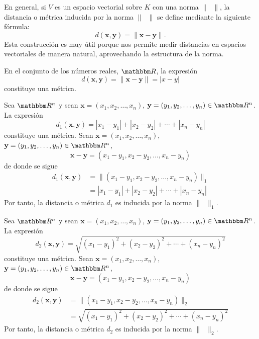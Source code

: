 En general, si $V$ es un espacio vectorial sobre $K$ con una norma $\| \phantom{x} \|$, la distancia o métrica inducida por la norma $\| \phantom{x} \|$ se define mediante la siguiente fórmula:
$$d(\mathbf{x}, \mathbf{y}) = \| \mathbf{x} - \mathbf{y} \|.$$
Esta construcción es muy útil porque nos permite medir distancias en espacios vectoriales de manera natural, aprovechando la estructura de la norma.

\begin{examplebox}{}{}
    En el conjunto de los números reales, $\RR$, la expresión
    $$d(\mathbf{x}, \mathbf{y}) = \| \mathbf{x} - \mathbf{y} \| = |x - y|$$
    constituye una métrica.
\end{examplebox}

\newpage

\begin{examplebox}{}{}
    Sea $\RR[n]$ y sean $\mathbf{x} = (x_1, x_2, \dots, x_n)$, $\mathbf{y} = (y_1, y_2, \dots, y_n) \in \RR[n]$. La expresión
    $$d_1( \mathbf{x}, \mathbf{y} ) = |x_1 - y_1| + |x_2 - y_2| + \cdots + |x_n - y_n|$$
    constituye una métrica. Sean $\mathbf{x} = (x_1, x_2, \dots, x_n)$, $\mathbf{y} = (y_1, y_2, \dots, y_n) \in \RR[n]$,
    $$\mathbf{x} - \mathbf{y} = (x_1 - y_1, x_2 - y_2, \dots, x_n - y_n)$$
    de donde se sigue
    \begin{align*}
        d_1( \mathbf{x}, \mathbf{y} ) & = \| (x_1 - y_1, x_2 - y_2, \dots, x_n - y_n) \|_1 \\
        & = |x_1 - y_1| + |x_2 - y_2| + \cdots + |x_n - y_n|
    \end{align*}
    Por tanto, la distancia o métrica $d_1$ es inducida por la norma $\| \phantom{x} \|_1$.
\end{examplebox}

\begin{examplebox}{}{}
    Sea $\RR[n]$ y sean $\mathbf{x} = (x_1, x_2, \dots, x_n)$, $\mathbf{y} = (y_1, y_2, \dots, y_n) \in \RR[n]$. La expresión
    $$d_2( \mathbf{x}, \mathbf{y} ) = \sqrt{(x_1 - y_1)^2 + (x_2 - y_2)^2 + \cdots + (x_n - y_n)^2}$$
    constituye una métrica. Sean $\mathbf{x} = (x_1, x_2, \dots, x_n)$, $\mathbf{y} = (y_1, y_2, \dots, y_n) \in \RR[n]$,
    $$\mathbf{x} - \mathbf{y} = (x_1 - y_1, x_2 - y_2, \dots, x_n - y_n)$$
    de donde se sigue
    \begin{align*}
        d_2( \mathbf{x}, \mathbf{y} ) & = \| (x_1 - y_1, x_2 - y_2, \dots, x_n - y_n) \|_2 \\
        & = \sqrt{(x_1 - y_1)^2 + (x_2 - y_2)^2 + \cdots + (x_n - y_n)^2}
    \end{align*}
    Por tanto, la distancia o métrica $d_2$ es inducida por la norma $\| \phantom{x} \|_2$.
\end{examplebox}

